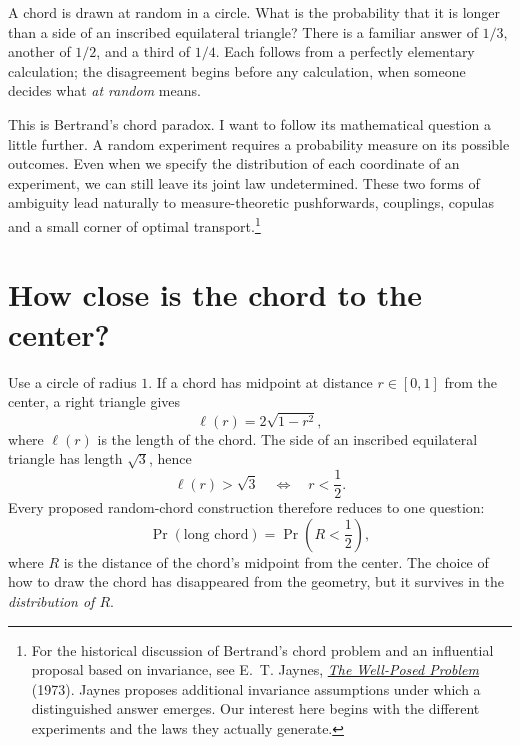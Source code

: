 
A chord is drawn at random in a circle. What is the probability that it is longer than a side of an inscribed equilateral triangle? There is a familiar answer of \(1/3\), another of \(1/2\), and a third of \(1/4\). Each follows from a perfectly elementary calculation; the disagreement begins before any calculation, when someone decides what \emph{at random} means.

This is Bertrand's chord paradox. I want to follow its mathematical question a little further. A random experiment requires a probability measure on its possible outcomes. Even when we specify the distribution of each coordinate of an experiment, we can still leave its joint law undetermined. These two forms of ambiguity lead naturally to measure-theoretic pushforwards, couplings, copulas and a small corner of optimal transport.\footnote{For the historical discussion of Bertrand's chord problem and an influential proposal based on invariance, see E.~T. Jaynes, \href{https://doi.org/10.1007/BF00709116}{\emph{The Well-Posed Problem}} (1973). Jaynes proposes additional invariance assumptions under which a distinguished answer emerges. Our interest here begins with the different experiments and the laws they actually generate.}

\section{How close is the chord to the center?}

Use a circle of radius \(1\). If a chord has midpoint at distance \(r\in[0,1]\) from the center, a right triangle gives
\begin{equation}
 \ell(r)=2\sqrt{1-r^2},
 \label{eq:N20261105-length}
\end{equation}
where \(\ell(r)\) is the length of the chord. The side of an inscribed equilateral triangle has length \(\sqrt3\), hence
\begin{equation}
 \ell(r)>\sqrt3
 \quad\Longleftrightarrow\quad
 r<\frac12.
 \label{eq:N20261105-long}
\end{equation}
Every proposed random-chord construction therefore reduces to one question:
\[
 \Pr(\text{long chord})=\Pr\left(R<\frac12\right),
\]
where \(R\) is the distance of the chord's midpoint from the center. The choice of how to draw the chord has disappeared from the geometry, but it survives in the \emph{distribution of \(R\)}.

